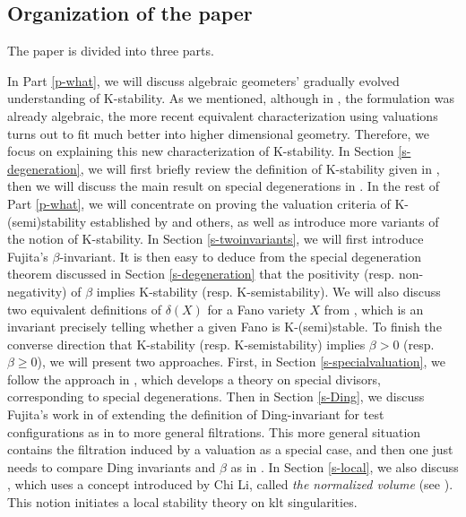 \documentclass[12pt,reqno]{amsart}%
\theoremstyle{definition}
\theoremstyle{remark}
\begin{document}
\subsection{Organization of the paper} The paper is divided into three parts. 

In Part \ref{p-what}, we will discuss algebraic geometers' gradually evolved understanding of K-stability. As we mentioned, although in \cite{Don02}, the formulation was already algebraic, the more recent equivalent characterization using valuations turns out to fit much better into higher dimensional geometry. Therefore, we focus on explaining this new characterization of K-stability. In Section \ref{s-degeneration}, we will first briefly review the definition of K-stability given in \cite{Tia97, Don02}, then we will discuss the main result on special degenerations in \cite{LX14}. In the rest of Part \ref{p-what}, we will concentrate on proving the valuation criteria of  K-(semi)stability established by \cite{Fuj19b, Li17} and others, as well as introduce more variants of the notion of K-stability. In Section \ref{s-twoinvariants}, we will first introduce Fujita's $\beta$-invariant. It is then easy to deduce from the special degeneration theorem discussed in Section \ref{s-degeneration} that the positivity (resp. non-negativity) of $\beta$ implies K-stability (resp. K-semistability). We will also discuss two equivalent definitions of $\delta(X)$ for a Fano variety $X$ from \cite{FO18, BJ20}, which is an invariant precisely telling whether a given Fano is K-(semi)stable. To finish the converse direction that K-stability (resp. K-semistability) implies $\beta> 0$ (resp. $\beta\ge0$), we will present two approaches. First, in Section \ref{s-specialvaluation}, we follow the approach in \cite{BLX19}, which develops a theory on special divisors, corresponding to special degenerations. Then in Section \ref{s-Ding}, we discuss Fujita's work in \cite{Fuj18} of extending the definition of Ding-invariant for test configurations as in \cite{Ber16} to more general filtrations. This more general situation contains the filtration induced by a valuation as a special case, and then one just needs to compare Ding invariants and $\beta$ as in \cite{Li17, Fuj19b}. In  Section \ref{s-local}, we also discuss \cite{Li17,LX20}, which uses a concept introduced by Chi Li, called {\it the normalized volume} (see \cite{Li18}). This notion initiates a local stability theory on klt singularities. 

\medskip
\end{document}
